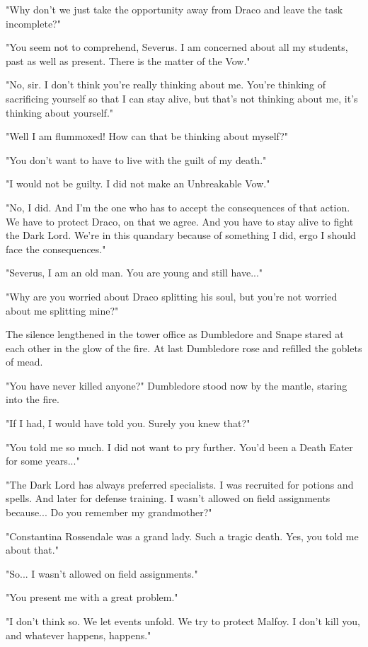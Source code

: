 \documentclass[a4paper,11pt]{article}
\begin{document}
"Why don't we just take the opportunity away from Draco and leave the task incomplete?"

"You seem not to comprehend, Severus. I am concerned about all my students, past as well as present. There is the matter of the Vow."

"No, sir. I don't think you're really thinking about me. You're thinking of sacrificing yourself so that I can stay alive, but that's not thinking about me, it's thinking about yourself."

"Well I am flummoxed! How can that be thinking about myself?"

"You don't want to have to live with the guilt of my death."

"I would not be guilty. I did not make an Unbreakable Vow."

"No, I did. And I'm the one who has to accept the consequences of that action. We have to protect Draco, on that we agree. And you have to stay alive to fight the Dark Lord. We're in this quandary because of something I did, ergo I should face the consequences."

"Severus, I am an old man. You are young and still have..."

"Why are you worried about Draco splitting his soul, but you're not worried about me splitting mine?"

The silence lengthened in the tower office as Dumbledore and Snape stared at each other in the glow of the fire. At last Dumbledore rose and refilled the goblets of mead.

"You have never killed anyone?" Dumbledore stood now by the mantle, staring into the fire.

"If I had, I would have told you. Surely you knew that?"

"You told me so much. I did not want to pry further. You'd been a Death Eater for some years..."

"The Dark Lord has always preferred specialists. I was recruited for potions and spells. And later for defense training. I wasn't allowed on field assignments because... Do you remember my grandmother?"

"Constantina Rossendale was a grand lady. Such a tragic death. Yes, you told me about that."

"So... I wasn't allowed on field assignments."

"You present me with a great problem."

"I don't think so. We let events unfold. We try to protect Malfoy. I don't kill you, and whatever happens, happens."
\end{document}
